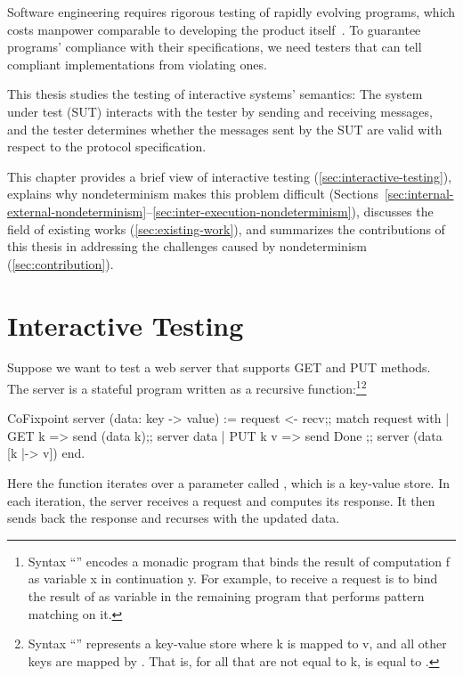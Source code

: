 Software engineering requires rigorous testing of rapidly evolving programs,
which costs manpower comparable to developing the product itself~\cite{vailshery}.  To guarantee
programs' compliance with their specifications, we need testers that can tell
compliant implementations from violating ones.

This thesis studies the testing of interactive systems' semantics: The system
under test (SUT) interacts with the tester by sending and receiving messages,
and the tester determines whether the messages sent by the SUT are valid
with respect to the protocol specification.

This chapter provides a brief view of interactive testing
(\autoref{sec:interactive-testing}), explains why nondeterminism makes this
problem difficult
(Sections~\ref{sec:internal-external-nondeterminism}--\ref{sec:inter-execution-nondeterminism}),
discusses the field of existing works (\autoref{sec:existing-work}), and
summarizes the contributions of this thesis in addressing the challenges caused
by nondeterminism (\autoref{sec:contribution}).

\section{Interactive Testing}
\label{sec:interactive-testing}
Suppose we want to test a web server that supports GET and PUT methods.  The
server is a stateful program written as a recursive function:\footnote{Syntax
``'' encodes a monadic program that binds the result of
computation \ilc f as variable \ilc x in continuation \ilc y.  For example, to
receive a request is to bind the result of  as variable 
in the remaining program that performs pattern matching on it.}\footnote{Syntax
``'' represents a key-value store where \ilc k is mapped
to \ilc v, and all other keys are mapped by .  That is, for
all  that are not equal to \ilc k,  is equal
to .}
\begin{coq}
  CoFixpoint server (data: key -> value) :=
    request <- recv;;
    match request with
    | GET k   => send (data k);; server  data
    | PUT k v => send  Done   ;; server (data [k |-> v])
    end.
\end{coq}
Here the  function iterates over a parameter called ,
which is a key-value store.  In each iteration, the server receives a request
and computes its response.  It then sends back the response and recurses with
the updated data.

